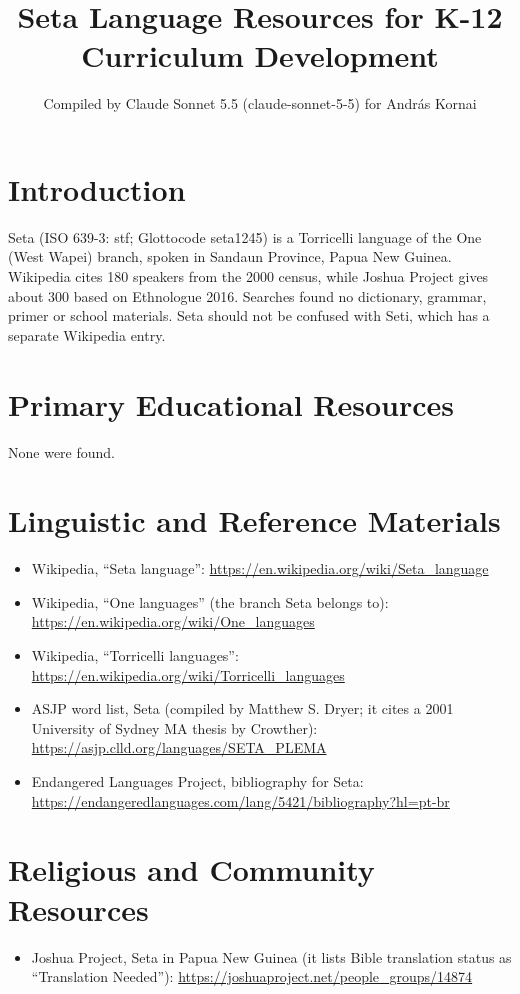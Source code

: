 \documentclass[12pt]{article}
\title{Seta Language Resources for K-12 Curriculum Development}
\author{Compiled by Claude Sonnet 5.5 (claude-sonnet-5-5) for Andr\'as Kornai}
\date{}
\begin{document}
\maketitle

\section{Introduction}
Seta (ISO 639-3: stf; Glottocode seta1245) is a Torricelli language of the One (West Wapei) branch, spoken in Sandaun Province, Papua New Guinea. Wikipedia cites 180 speakers from the 2000 census, while Joshua Project gives about 300 based on Ethnologue 2016. Searches found no dictionary, grammar, primer or school materials. Seta should not be confused with Seti, which has a separate Wikipedia entry.

\section{Primary Educational Resources}
None were found.

\section{Linguistic and Reference Materials}
\begin{itemize}
\item Wikipedia, ``Seta language'': \url{https://en.wikipedia.org/wiki/Seta_language}
\item Wikipedia, ``One languages'' (the branch Seta belongs to): \url{https://en.wikipedia.org/wiki/One_languages}
\item Wikipedia, ``Torricelli languages'': \url{https://en.wikipedia.org/wiki/Torricelli_languages}
\item ASJP word list, Seta (compiled by Matthew S. Dryer; it cites a 2001 University of Sydney MA thesis by Crowther): \url{https://asjp.clld.org/languages/SETA_PLEMA}
\item Endangered Languages Project, bibliography for Seta: \url{https://endangeredlanguages.com/lang/5421/bibliography?hl=pt-br}
\end{itemize}

\section{Religious and Community Resources}
\begin{itemize}
\item Joshua Project, Seta in Papua New Guinea (it lists Bible translation status as ``Translation Needed''): \url{https://joshuaproject.net/people_groups/14874}
\end{itemize}
\end{document}
